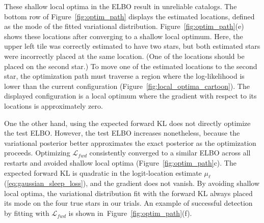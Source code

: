 These shallow local optima in the ELBO result in unreliable catalogs.
The bottom row of Figure~\ref{fig:optim_path} displays the estimated locations, defined as the mode of the fitted variational distribution.
Figure~\ref{fig:optim_path}(e) shows these locations after converging to a shallow local optimum.
Here, the upper left tile was correctly estimated to have two stars, but both estimated stars were incorrectly placed at the same location.
(One of the locations should be placed on the second star.)
To move one of the estimated locations to the second star, the optimization path must traverse a region where the log-likelihood is lower than the current configuration (Figure~\ref{fig:local_optima_cartoon}).
The displayed configuration is a local optimum where the gradient with respect to its locations is approximately zero.

One the other hand, using
the expected forward KL does not directly optimize the test ELBO.
However, the test ELBO increases nonetheless, because the variational posterior
better approximates the exact posterior as the optimization proceeds.
Optimizing $\mathcal{L}_{fwd}$ consistently converged to
a similar ELBO across all restarts and avoided shallow local optima (Figure~\ref{fig:optim_path}c).
The expected forward KL is quadratic in the logit-location estimate
$\mu_\ell$ (\ref{eq:gaussian_sleep_loss}),
and the gradient does not vanish.
By avoiding shallow local optima, the variational distribution fit with the forward KL
always placed its mode on the four true stars in our trials.
An example of successful detection by fitting with
$\mathcal{L}_{fwd}$ is shown in~Figure~\ref{fig:optim_path}(f).


